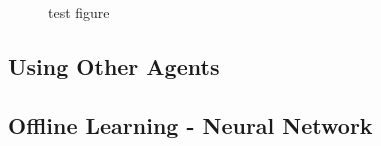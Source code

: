\documentclass[12pt]{article}
\numberwithin{equation}{section}
\begin{document}
			\begin{figure}[h]
				\centering
				\captionsetup{justification=centering}
				\caption{test figure}
				\label{fig:test_figure}
			\end{figure}



		\subsection{Using Other Agents}		\label{sec:implementation.using_other_agents}
			
			\paragraph{}


		\subsection{Offline Learning - Neural Network}		\label{sec:implementation.neural_network}
\end{document}
